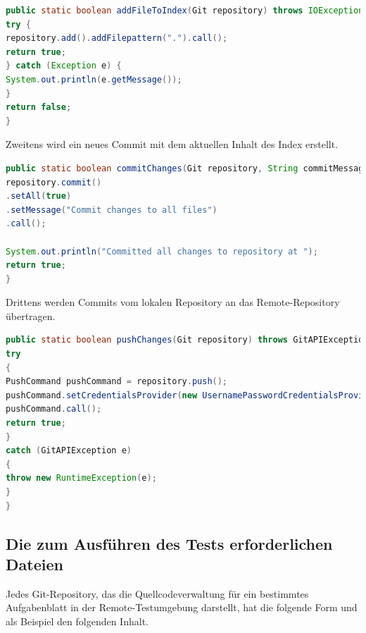\documentclass[a4paper,12pt,oneside]{book}
\begin{document}
\begin{lstlisting}[language=JAVA,caption=Add File To Index ]
public static boolean addFileToIndex(Git repository) throws IOException, GitAPIException {
try {
repository.add().addFilepattern(".").call();
return true;
} catch (Exception e) {
System.out.println(e.getMessage());
}
return false;
}
\end{lstlisting} 
Zweitens wird ein neues Commit mit dem aktuellen Inhalt des Index erstellt.
\begin{lstlisting}[language=JAVA,caption=commit Changes ]
	public static boolean commitChanges(Git repository, String commitMessage) throws GitAPIException, IOException {
repository.commit()
.setAll(true)
.setMessage("Commit changes to all files")
.call();

System.out.println("Committed all changes to repository at ");
return true;
}
\end{lstlisting} 
Drittens werden Commits vom lokalen Repository an das Remote-Repository übertragen.
\begin{lstlisting}[language=JAVA,caption=Push Changes ]
public static boolean pushChanges(Git repository) throws GitAPIException, URISyntaxException, IOException {
try
{
PushCommand pushCommand = repository.push();
pushCommand.setCredentialsProvider(new UsernamePasswordCredentialsProvider("swissi", "Mh123456"));
pushCommand.call();
return true;
}
catch (GitAPIException e)
{
throw new RuntimeException(e);
}
}
\end{lstlisting} 

 
\subsection{Die zum Ausführen des Tests erforderlichen Dateien}
Jedes Git-Repository, das die Quellcodeverwaltung für ein bestimmtes Aufgabenblatt in der Remote-Testumgebung darstellt, hat die folgende Form und als Beispiel den folgenden Inhalt.
\newline
{}
\end{document}
